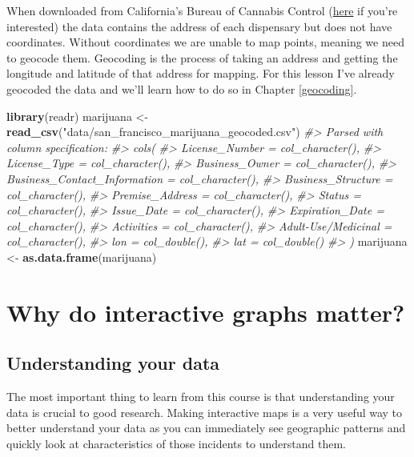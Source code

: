 \documentclass[
  12pt,
]{book}
\newenvironment{Shaded}{\begin{snugshade}}{\end{snugshade}}
\newcommand{\CommentTok}[1]{\textcolor[rgb]{0.37,0.37,0.37}{\textit{#1}}}
\newcommand{\KeywordTok}[1]{\textcolor[rgb]{0.27,0.27,0.27}{\textbf{#1}}}
\newcommand{\NormalTok}[1]{#1}
\newcommand{\StringTok}[1]{\textcolor[rgb]{0.5,0.5,0.5}{#1}}
\begin{document}
When downloaded from California's Bureau of Cannabis Control (\href{https://aca5.accela.com/bcc/customization/bcc/cap/licenseSearch.aspx}{here} if you're interested) the data contains the address of each dispensary but does not have coordinates. Without coordinates we are unable to map points, meaning we need to
geocode them. Geocoding is the process of taking an address and getting the longitude and latitude of that address for mapping. For this lesson I've already geocoded the data and we'll learn how to do so in Chapter \ref{geocoding}.

\begin{Shaded}
\begin{Highlighting}[]
\KeywordTok{library}\NormalTok{(readr)}
\NormalTok{marijuana <{-}}\StringTok{ }\KeywordTok{read\_csv}\NormalTok{(}\StringTok{"data/san\_francisco\_marijuana\_geocoded.csv"}\NormalTok{)}
\CommentTok{\#> Parsed with column specification:}
\CommentTok{\#> cols(}
\CommentTok{\#>   License\_Number = col\_character(),}
\CommentTok{\#>   License\_Type = col\_character(),}
\CommentTok{\#>   Business\_Owner = col\_character(),}
\CommentTok{\#>   Business\_Contact\_Information = col\_character(),}
\CommentTok{\#>   Business\_Structure = col\_character(),}
\CommentTok{\#>   Premise\_Address = col\_character(),}
\CommentTok{\#>   Status = col\_character(),}
\CommentTok{\#>   Issue\_Date = col\_character(),}
\CommentTok{\#>   Expiration\_Date = col\_character(),}
\CommentTok{\#>   Activities = col\_character(),}
\CommentTok{\#>   \textasciigrave{}Adult{-}Use/Medicinal\textasciigrave{} = col\_character(),}
\CommentTok{\#>   lon = col\_double(),}
\CommentTok{\#>   lat = col\_double()}
\CommentTok{\#> )}
\NormalTok{marijuana <{-}}\StringTok{ }\KeywordTok{as.data.frame}\NormalTok{(marijuana)}
\end{Highlighting}
\end{Shaded}

\hypertarget{why-do-interactive-graphs-matter}{%
\section{Why do interactive graphs matter?}\label{why-do-interactive-graphs-matter}}

\hypertarget{understanding-your-data}{%
\subsection{Understanding your data}\label{understanding-your-data}}

The most important thing to learn from this course is that understanding your data is crucial to good research. Making interactive maps is a very useful way to better understand your data as you can immediately see geographic patterns and quickly look at characteristics of those incidents to understand them.
\end{document}

